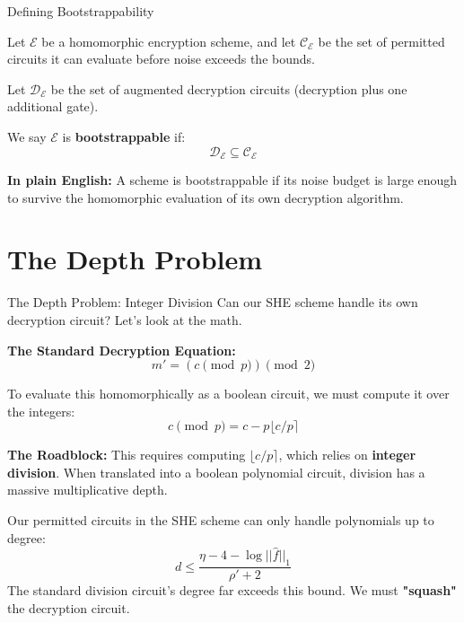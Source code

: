 \documentclass[10pt, aspectratio=169]{beamer}
\begin{document}
\begin{frame}{Defining Bootstrappability}
    \begin{definition}
    Let $\mathcal{E}$ be a homomorphic encryption scheme, and let $\mathcal{C}_{\mathcal{E}}$ be the set of permitted circuits it can evaluate before noise exceeds the bounds. 
    
    Let $\mathcal{D}_{\mathcal{E}}$ be the set of augmented decryption circuits (decryption plus one additional gate). 
    
    We say $\mathcal{E}$ is \textbf{bootstrappable} if:
    $$\mathcal{D}_{\mathcal{E}} \subseteq \mathcal{C}_{\mathcal{E}}$$
    \end{definition}
    \pause
    
    \vspace{0.3cm}
    \textbf{In plain English:} A scheme is bootstrappable if its noise budget is large enough to survive the homomorphic evaluation of its own decryption algorithm.
\end{frame}

\section{The Depth Problem}
\begin{frame}{The Depth Problem: Integer Division}
    Can our SHE scheme handle its own decryption circuit? Let's look at the math.
    
    \textbf{The Standard Decryption Equation:}
    $$m' = (c \pmod p) \pmod 2$$
    \pause
    
    To evaluate this homomorphically as a boolean circuit, we must compute it over the integers:
    $$c \pmod p = c - p \lfloor c/p \rceil$$
    \pause
    
    \vspace{0.3cm}
    \textbf{The Roadblock:}
    This requires computing $\lfloor c/p \rceil$, which relies on \textbf{integer division}. When translated into a boolean polynomial circuit, division has a massive multiplicative depth.
    \pause
    
    \vspace{0.3cm}
    Our permitted circuits in the SHE scheme can only handle polynomials up to degree:
    $$d \le \frac{\eta - 4 - \log||\hat{f}||_1}{\rho' + 2}$$
    The standard division circuit's degree far exceeds this bound. We must \textbf{"squash"} the decryption circuit.
\end{frame}
\end{document}
